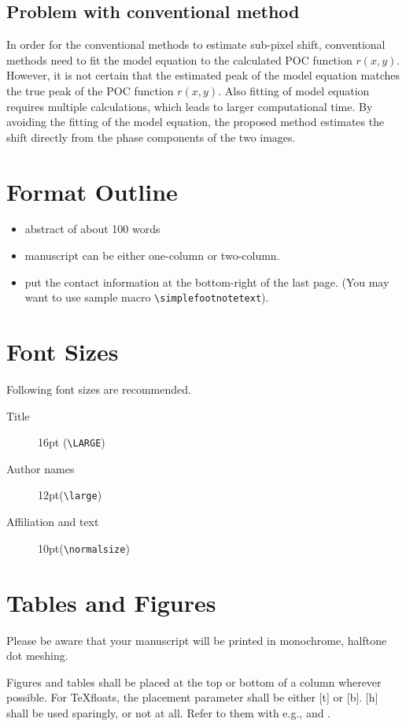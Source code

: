 \documentclass[a4paper,10pt,dvipdfmx,twocolumn,english]{jsarticle}
\begin{document}
\subsection{Problem with conventional method}
\label{problemofCM}
In order for the conventional methods to estimate sub-pixel shift, 
   conventional methods need to fit the model equation to the calculated POC function $r(x,y)$. 
However, it is not certain that the estimated peak 
   of the model equation matches the true peak of the POC function $r(x,y)$.
Also fitting of model equation requires multiple calculations, 
   which leads to larger computational time.
By avoiding the fitting of the model equation, 
   the proposed method estimates the shift directly from the phase components of the two images.


\section{Format Outline}

\begin{itemize}
   \item abstract of about 100 words
   \item manuscript can be either one-column or two-column.
   \item put the contact information at the bottom-right of the 
         last page. (You may want to use sample macro \verb|\simplefootnotetext|).
\end{itemize}

\section{Font Sizes}

Following font sizes are recommended.
\begin{description}
   \item[Title] 16pt (\verb|\LARGE|)
   \item[Author names] 12pt(\verb|\large|)
   \item[Affiliation and text] 10pt(\verb|\normalsize|)
\end{description}


\section{Tables and Figures}
Please be aware that your manuscript will be printed in monochrome, 
halftone dot meshing.

Figures and tables shall be placed at the top or bottom of a column wherever possible.
For \TeX floats, the placement parameter shall be either [t] or [b]. [h] shall be 
used sparingly, or not at all.
Refer to them with e.g., 
 and .
\end{document}
